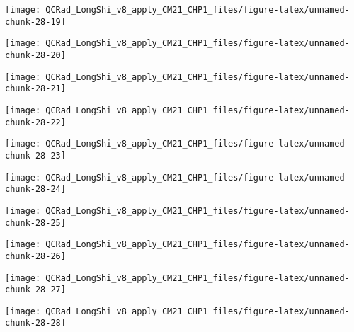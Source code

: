 \documentclass[
  10pt,
  a4paper,oneside]{article}
\begin{document}
\begin{center}\texttt{[image: QCRad\_LongShi\_v8\_apply\_CM21\_CHP1\_files/figure-latex/unnamed-chunk-28-19]} \end{center}

\begin{center}\texttt{[image: QCRad\_LongShi\_v8\_apply\_CM21\_CHP1\_files/figure-latex/unnamed-chunk-28-20]} \end{center}

\begin{center}\texttt{[image: QCRad\_LongShi\_v8\_apply\_CM21\_CHP1\_files/figure-latex/unnamed-chunk-28-21]} \end{center}

\begin{center}\texttt{[image: QCRad\_LongShi\_v8\_apply\_CM21\_CHP1\_files/figure-latex/unnamed-chunk-28-22]} \end{center}

\begin{center}\texttt{[image: QCRad\_LongShi\_v8\_apply\_CM21\_CHP1\_files/figure-latex/unnamed-chunk-28-23]} \end{center}

\begin{center}\texttt{[image: QCRad\_LongShi\_v8\_apply\_CM21\_CHP1\_files/figure-latex/unnamed-chunk-28-24]} \end{center}

\begin{center}\texttt{[image: QCRad\_LongShi\_v8\_apply\_CM21\_CHP1\_files/figure-latex/unnamed-chunk-28-25]} \end{center}

\begin{center}\texttt{[image: QCRad\_LongShi\_v8\_apply\_CM21\_CHP1\_files/figure-latex/unnamed-chunk-28-26]} \end{center}

\begin{center}\texttt{[image: QCRad\_LongShi\_v8\_apply\_CM21\_CHP1\_files/figure-latex/unnamed-chunk-28-27]} \end{center}

\begin{center}\texttt{[image: QCRad\_LongShi\_v8\_apply\_CM21\_CHP1\_files/figure-latex/unnamed-chunk-28-28]} \end{center}
\end{document}
